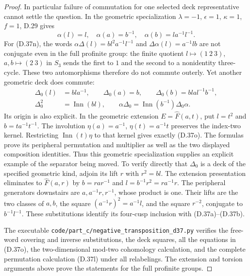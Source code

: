 \begin{proof}
In particular failure of commutation for one selected
deck representative cannot settle the question.  In the
geometric specialization $\lambda=-1$, $\epsilon=1$,
$\kappa=1$, $f=1$, D.29 gives
\[
 \alpha(l)=l,\quad\alpha(a)=b^{-1},\quad
                         \alpha(b)=la^{-1}l^{-1}.
\]
For (D.37n), the words
$\alpha\Delta(l)=bl^2a^{-1}l^{-1}$ and
$\Delta\alpha(l)=a^{-1}lb$ are not conjugate even
in the full profinite group: the finite quotient
$l\mapsto(1\ 2\ 3)$, $a,b\mapsto(2\ 3)$ in $S_3$
sends the first to $1$ and the second to a nonidentity
three-cycle.  These two automorphisms therefore do not
commute outerly.  Yet another geometric deck does commute:
\[
 \begin{aligned}
 \Delta_0(l)&=bla^{-1},\qquad \Delta_0(a)=b,\qquad
                  \Delta_0(b)=blal^{-1}b^{-1},\\
 \Delta_0^2&=\operatorname{Inn}(bl),\qquad
       \alpha\Delta_0=\operatorname{Inn}(b^{-1})\Delta_0\alpha.
 \end{aligned}
                                                        \tag{D.37o}
\]
Its origin is also explicit.  In the geometric extension
$E=\widehat F(a,t)$, put $l=t^2$ and
$b=ta^{-1}t^{-1}$.  The involution
$\eta(a)=a^{-1}$, $\eta(t)=a^{-1}t$ preserves the
index-two kernel.  Restricting
$\operatorname{Inn}(t)\eta$ to that kernel gives
exactly (D.37o).  The formulas prove its peripheral
permutation and multiplier as well as the two displayed
composition identities.  Thus this geometric
specialization supplies an explicit example of the
separator being moved.
To verify directly that $\Delta_0$ is a deck of the
specified geometric kind, adjoin its lift $r$ with
$r^2=bl$.  The extension presentation eliminates to
$\widehat F(a,r)$ by
$b=rar^{-1}$ and $l=b^{-1}r^2=ra^{-1}r$.
The peripheral generators downstairs are
$a,a^{-1}r,r^{-1}$, whose product is one.
Their lifts are the two classes of $a,b$, the square
$(a^{-1}r)^2=a^{-1}l$, and the square $r^{-2}$,
conjugate to $b^{-1}l^{-1}$.  These substitutions identify
its four-cusp inclusion with (D.37a)--(D.37b).

The executable \texttt{code/part\_c/negative\_transposition\_d37.py}
verifies the free-word covering and inverse substitutions,
the deck squares, all the equations in (D.37o), the
two-dimensional mod-two cohomology calculation, and the
complete permutation calculation (D.37l) under all
relabelings.  The extension and torsion arguments above
prove the statements for the full profinite groups.
\end{proof}
